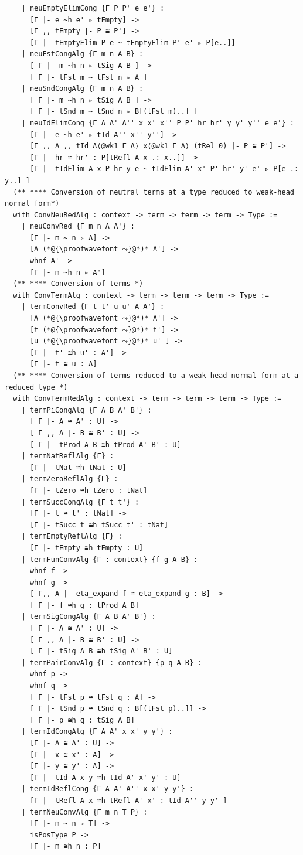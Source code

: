 \begin{lstlisting}
    | neuEmptyElimCong {Γ P P' e e'} :
      [Γ |- e ~h e' ▹ tEmpty] ->
      [Γ ,, tEmpty |- P ≅ P'] ->
      [Γ |- tEmptyElim P e ~ tEmptyElim P' e' ▹ P[e..]]
    | neuFstCongAlg {Γ m n A B} :
      [ Γ |- m ~h n ▹ tSig A B ] ->
      [ Γ |- tFst m ~ tFst n ▹ A ]
    | neuSndCongAlg {Γ m n A B} :
      [ Γ |- m ~h n ▹ tSig A B ] ->
      [ Γ |- tSnd m ~ tSnd n ▹ B[(tFst m)..] ]
    | neuIdElimCong {Γ A A' A'' x x' x'' P P' hr hr' y y' y'' e e'} :
      [Γ |- e ~h e' ▹ tId A'' x'' y''] ->
      [Γ ,, A ,, tId A⟨@wk1 Γ A⟩ x⟨@wk1 Γ A⟩ (tRel 0) |- P ≅ P'] ->
      [Γ |- hr ≅ hr' : P[tRefl A x .: x..]] ->
      [Γ |- tIdElim A x P hr y e ~ tIdElim A' x' P' hr' y' e' ▹ P[e .: y..] ]
  (** **** Conversion of neutral terms at a type reduced to weak-head normal form*)
  with ConvNeuRedAlg : context -> term -> term -> term -> Type :=
    | neuConvRed {Γ m n A A'} :
      [Γ |- m ~ n ▹ A] ->
      [A (*@{\proofwavefont ⤳}@*)* A'] ->
      whnf A' ->
      [Γ |- m ~h n ▹ A']
  (** **** Conversion of terms *)
  with ConvTermAlg : context -> term -> term -> term -> Type :=
    | termConvRed {Γ t t' u u' A A'} :
      [A (*@{\proofwavefont ⤳}@*)* A'] ->
      [t (*@{\proofwavefont ⤳}@*)* t'] ->
      [u (*@{\proofwavefont ⤳}@*)* u' ] ->
      [Γ |- t' ≅h u' : A'] ->
      [Γ |- t ≅ u : A]
  (** **** Conversion of terms reduced to a weak-head normal form at a reduced type *)
  with ConvTermRedAlg : context -> term -> term -> term -> Type :=
    | termPiCongAlg {Γ A B A' B'} :
      [ Γ |- A ≅ A' : U] ->
      [ Γ ,, A |- B ≅ B' : U] ->
      [ Γ |- tProd A B ≅h tProd A' B' : U]
    | termNatReflAlg {Γ} :
      [Γ |- tNat ≅h tNat : U]
    | termZeroReflAlg {Γ} :
      [Γ |- tZero ≅h tZero : tNat]
    | termSuccCongAlg {Γ t t'} :
      [Γ |- t ≅ t' : tNat] ->
      [Γ |- tSucc t ≅h tSucc t' : tNat]
    | termEmptyReflAlg {Γ} :
      [Γ |- tEmpty ≅h tEmpty : U]
    | termFunConvAlg {Γ : context} {f g A B} :
      whnf f ->
      whnf g ->
      [ Γ,, A |- eta_expand f ≅ eta_expand g : B] -> 
      [ Γ |- f ≅h g : tProd A B]
    | termSigCongAlg {Γ A B A' B'} :
      [ Γ |- A ≅ A' : U] ->
      [ Γ ,, A |- B ≅ B' : U] ->
      [ Γ |- tSig A B ≅h tSig A' B' : U]
    | termPairConvAlg {Γ : context} {p q A B} :
      whnf p ->
      whnf q ->
      [ Γ |- tFst p ≅ tFst q : A] -> 
      [ Γ |- tSnd p ≅ tSnd q : B[(tFst p)..]] -> 
      [ Γ |- p ≅h q : tSig A B]
    | termIdCongAlg {Γ A A' x x' y y'} :
      [Γ |- A ≅ A' : U] ->
      [Γ |- x ≅ x' : A] ->
      [Γ |- y ≅ y' : A] ->
      [Γ |- tId A x y ≅h tId A' x' y' : U]
    | termIdReflCong {Γ A A' A'' x x' y y'} :
      [Γ |- tRefl A x ≅h tRefl A' x' : tId A'' y y' ]
    | termNeuConvAlg {Γ m n T P} :
      [Γ |- m ~ n ▹ T] ->
      isPosType P ->
      [Γ |- m ≅h n : P]


\end{lstlisting}
